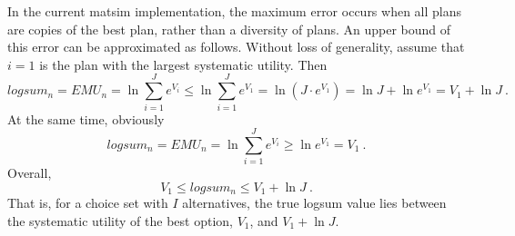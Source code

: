In the current \gls{matsim} implementation, the maximum error occurs when all plans are copies of the best plan, rather than a diversity of plans.
%
An upper bound of this error 
can be approximated as follows.  Without loss of 
generality, assume that $i=1$ is the plan with the largest systematic utility.  Then
\[
logsum_n = EMU_n = \ln \sum_{i=1}^{J} e^{V_{i}}
%
\le \ln \sum_{i=1}^{J} e^{V_{1}}
%
= \ln ( J \cdot e^{V_{1}} )
%
= \ln J + \ln e^{V_{1}}
%
= V_{1} + \ln J \ .
\]
At the same time, obviously
\[
logsum_n = EMU_n = \ln \sum_{i=1}^{J} e^{V_i} \ge \ln e^{V_1} = V_1 \ .
\]
Overall,
\[
V_1 \le logsum_n \le V_1 + \ln J \ .
\]
That is, for a choice set with $I$ alternatives, the true logsum value lies between the systematic utility of the best option, $V_1$, and $V_1 + \ln J$.








